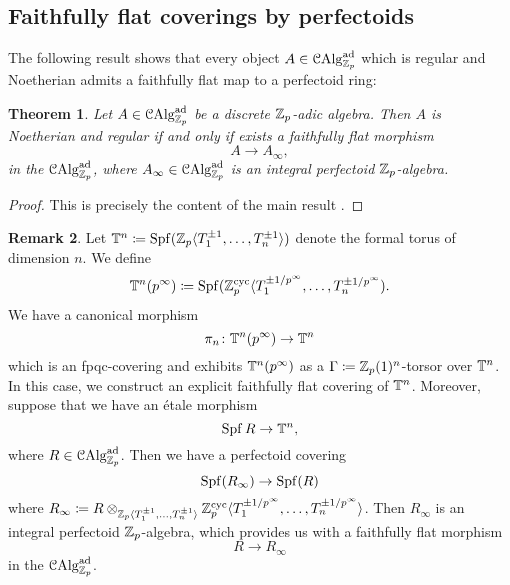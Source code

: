 \documentclass[10pt,a4paper]{amsart}
\numberwithin{equation}{subsection}
\newtheorem{theorem}{Theorem}[subsection]
\theoremstyle{definition}
\newtheorem{remark}[theorem]{Remark}
\begin{document}
\subsection{Faithfully flat coverings by perfectoids}
The following result shows that every object $A \in \mathcal C \mathrm{Alg}^{\mathrm{ad}}_{\mathbb Z_p}$ which is regular and Noetherian admits a faithfully flat map to a perfectoid ring:

\begin{theorem}
    Let $A \in \mathcal C \mathrm{Alg}^{\mathrm{ad}}_{\mathbb Z_p}$ be a discrete $\mathbb Z_p$-adic algebra. Then $A$ is Noetherian and regular if and only if exists a faithfully flat morphism
        \[
                A \to A_\infty  ,
        \]
    in the \infcat $\mathcal C \mathrm{Alg}^{\mathrm{ad}}_{\mathbb Z_p}$, where $A_\infty \in \mathcal C \mathrm{Alg}^{\mathrm{ad}}_{\mathbb Z_p}$ is an integral perfectoid $\mathbb Z_p$-algebra.
\end{theorem}

\begin{proof}
    This is precisely the content of the main result \cite[Theorem 4.7]{bhatt2019regular}.
\end{proof}

\begin{remark}
    Let $\mathbb T^n \coloneqq \operatorname{Spf} (\mathbb Z_p \langle T_1^{\pm 1}, \dots , T_n^{\pm 1} \rangle)$ denote the formal torus of dimension $n$. We define
        \[
                \mathbb T^n(p^\infty) \coloneqq \operatorname{Spf} ( \mathbb Z_p^{\mathrm{cyc}} \langle T_1^{\pm 1/p^\infty}, \dots, T_n^{\pm 1/p^\infty})  .
        \]
    We have a canonical morphism
        \[
            \pi_n \colon \mathbb T^n(p^\infty) \to \mathbb T^n  
        \]
    which is an fpqc-covering and exhibits $\mathbb T^n(p^\infty)$ as a $\Gamma \coloneqq \mathbb Z_p(1)^n$-torsor over $\mathbb T^n$. 
    In this case, we construct an explicit faithfully flat covering of $\mathbb T^n$. Moreover, suppose that we have an \'etale morphism 
        \[
                \operatorname{Spf} R \to \mathbb T^n,
        \]
    where $ R \in \mathcal C \mathrm{Alg}^{\mathrm{ad}}_{\mathbb Z_p}$. Then we have a perfectoid covering
        \[
                \operatorname{Spf} (R_\infty) \to \operatorname{Spf}(R)  
        \]
    where $R_\infty \coloneqq R \otimes_{\mathbb Z_p \langle T_1^{\pm 1}, \dots , T_n^{\pm 1} \rangle} \mathbb Z_p^{\mathrm{cyc}} \langle T_1^{\pm 1/p^\infty}, \dots, T_n^{\pm 1/p^\infty} \rangle$.
    Then $R_\infty$ is an integral perfectoid $\mathbb Z_p$-algebra, which provides us with a faithfully flat morphism
        \[
                R \to R_\infty    
        \] 
    in the \infcat $\mathcal C \mathrm{Alg}^{\mathrm{ad}}_{\mathbb Z_p}$. 
\end{remark}
\end{document}
